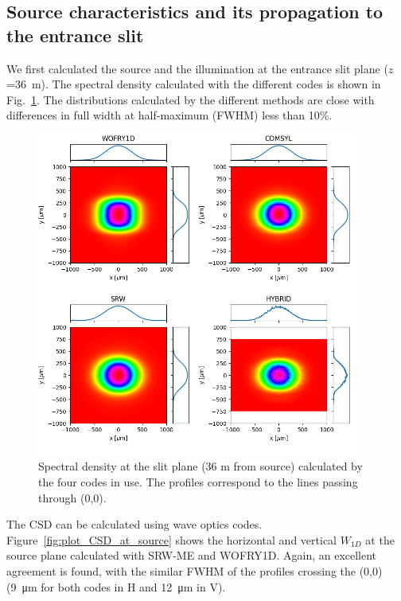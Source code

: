 \documentclass{iucr}              %
\begin{document}
\subsection{Source characteristics and its propagation to the entrance slit}
\label{sec:results36m}

We first calculated the source and the illumination at the entrance slit plane ($z$=\SI{36}{\meter}).
The spectral density calculated with the different codes is shown in Fig.~\ref{fig:plot_2D_spectral_density_36m}. The distributions calculated by the different methods are close with differences in full width at half-maximum (FWHM) less than 10\%.

\begin{figure}
    \label{fig:plot_2D_spectral_density_36m}
    \includegraphics[width=0.95\textwidth]{figures/plot_2D_spectral_density_36m.png}
    \caption{Spectral density at the slit plane (36 m from source) calculated by the four codes in use. The profiles correspond to the lines passing through (0,0).
    }
\end{figure}

The CSD can be calculated using wave optics codes. 
Figure~\ref{fig:plot_CSD_at_source} shows the horizontal and vertical $W_{1D}$ at the source plane calculated with SRW-ME and WOFRY1D.
Again, an excellent agreement is found, with the similar FWHM of the profiles crossing the (0,0) (\SI{9}{\micro\meter} for both codes in H and \SI{12}{\micro\meter} in V).
\end{document}
